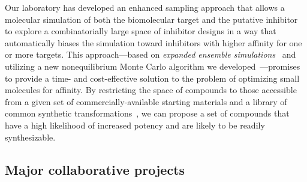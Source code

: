 \documentclass[10pt]{article}
\begin{document}
Our laboratory has developed an enhanced sampling approach that allows a molecular simulation of both the biomolecular target and the putative inhibitor to explore a combinatorially large space of inhibitor designs in a way that automatically biases the simulation toward inhibitors with higher affinity for one or more targets.
This approach---based on \emph{expanded ensemble simulations}~\cite{lyubartsev:jcp:1992:expanded-ensembles} and utilizing a new nonequilibrium Monte Carlo algorithm we developed~\cite{ncmc}---promises to provide a time- and cost-effective solution to the problem of optimizing small molecules for affinity.
By restricting the space of compounds to those accessible from a given set of commercially-available starting materials and a library of common synthetic transformations~\cite{Roughley:2011:J.Med.Chem.}, we can propose a set of compounds that have a high likelihood of increased potency and are likely to be readily synthesizable.


%
%


\subsection*{Major collaborative projects}
\end{document}
